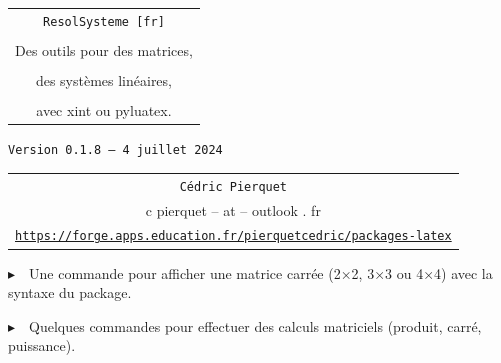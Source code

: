 \documentclass[french,a4paper,11pt]{article}
\def\TPversion{0.1.8}
\def\TPdate{4 juillet 2024}
\begin{document}
\setlength{\aweboxleftmargin}{0.07\linewidth}
\setlength{\aweboxcontentwidth}{0.93\linewidth}
\setlength{\aweboxvskip}{8pt}

\pagestyle{fancy}

\thispagestyle{empty}

\vspace{2cm}

\begin{center}
	\begin{minipage}{0.75\linewidth}
	\begin{tcolorbox}[colframe=yellow,colback=yellow!15]
		\begin{center}
			\begin{tabular}{c}
				{\Huge \texttt{ResolSysteme [fr]}}\\
				\\
				{\LARGE Des outils pour des matrices, } \\
				\\
				{\LARGE des systèmes linéaires,} \\
				\\
				{\LARGE avec xint ou pyluatex.} \\
			\end{tabular}
			
			\bigskip
			
			{\small \texttt{Version \TPversion{} -- \TPdate}}
		\end{center}
	\end{tcolorbox}
\end{minipage}
\end{center}

\begin{center}
	\begin{tabular}{c}
	\texttt{Cédric Pierquet}\\
	{\ttfamily c pierquet -- at -- outlook . fr}\\
	\texttt{\url{https://forge.apps.education.fr/pierquetcedric/packages-latex}}
\end{tabular}
\end{center}

\vspace{0.25cm}

{$\blacktriangleright$~~Une commande pour afficher une matrice carrée (2×2, 3×3 ou 4×4) avec la syntaxe du package.}

\smallskip

{$\blacktriangleright$~~Quelques commandes pour effectuer des calculs matriciels (produit, carré, puissance).}
\end{document}
